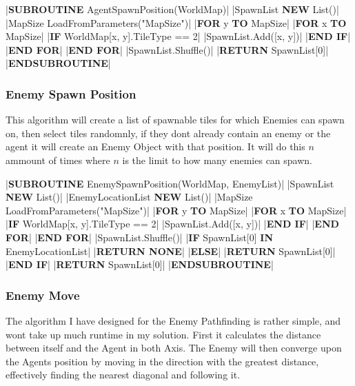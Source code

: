 \begin{flushleft}
                \vspace{0.2cm}
                \begin{pseudocode}
|\textbf{SUBROUTINE} AgentSpawnPosition(WorldMap)|
    |SpawnList \leftarrow \textbf{NEW} List()|
    |MapSize \leftarrow LoadFromParameters("MapSize")|
    |\textbf{FOR} y  \textbf{TO} MapSize|
        |\textbf{FOR} x  \textbf{TO} MapSize|
            |\textbf{IF} WorldMap[x, y].TileType == 2|
                |SpawnList.Add([x, y])|
            |\textbf{END IF}|
        |\textbf{END FOR}|
    |\textbf{END FOR}|
    |SpawnList.Shuffle()|
    |\textbf{RETURN} SpawnList[0]|
|\textbf{ENDSUBROUTINE}|
                \end{pseudocode}

                \vspace{0.5cm}
            \subsubsection{Enemy Spawn Position}
                This algorithm will create a list of spawnable tiles for which Enemies can spawn on, then select tiles randomnly, if they dont
                already contain an enemy or the agent it will create an Enemy Object with that position. It will do this $n$ ammount of times 
                where $n$ is the limit to how many enemies can spawn.
                
                \vspace{0.2cm}
                \begin{pseudocode}
|\textbf{SUBROUTINE} EnemySpawnPosition(WorldMap, EnemyList)|
    |SpawnList \leftarrow \textbf{NEW} List()|
    |EnemyLocationList \leftarrow \textbf{NEW} List()|
    |MapSize \leftarrow LoadFromParameters("MapSize")|
    |\textbf{FOR} y  \textbf{TO} MapSize|
        |\textbf{FOR} x  \textbf{TO} MapSize|
            |\textbf{IF} WorldMap[x, y].TileType == 2|
                |SpawnList.Add([x, y])|
            |\textbf{END IF}|
        |\textbf{END FOR}|
    |\textbf{END FOR}|
    |SpawnList.Shuffle()|
    |\textbf{IF} SpawnList[0] \textbf{IN} EnemyLocationList|
        |\textbf{RETURN NONE}|
    |\textbf{ELSE}|
        |\textbf{RETURN} SpawnList[0]|
    |\textbf{END IF}|
    |\textbf{RETURN} SpawnList[0]|
|\textbf{ENDSUBROUTINE}|
                \end{pseudocode}

                \vspace{0.5cm}
            \subsubsection{Enemy Move}
                The algorithm I have designed for the Enemy Pathfinding is rather simple, and wont take up much runtime in my solution.
                First it calculates the distance between itself and the Agent in both Axis. The Enemy will then converge upon the Agents
                position by moving in the direction with the greatest distance, effectively finding the nearest diagonal and following it.


\end{flushleft}
